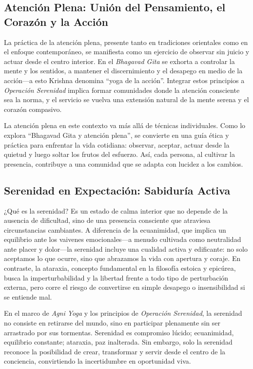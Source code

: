 \documentclass[
]{book}
\begin{document}
\subsection{Atención Plena: Unión del Pensamiento, el Corazón y la Acción}\label{atenciuxf3n-plena-uniuxf3n-del-pensamiento-el-corazuxf3n-y-la-acciuxf3n}

La práctica de la atención plena, presente tanto en tradiciones orientales como en el enfoque contemporáneo, se manifiesta como un ejercicio de observar sin juicio y actuar desde el centro interior. En el \emph{Bhagavad Gita} se exhorta a controlar la mente y los sentidos, a mantener el discernimiento y el desapego en medio de la acción---a esto Krishna denomina ``yoga de la acción''. Integrar estos principios a \emph{Operación Serenidad} implica formar comunidades donde la atención consciente sea la norma, y el servicio se vuelva una extensión natural de la mente serena y el corazón compasivo.

La atención plena en este contexto va más allá de técnicas individuales. Como lo explora ``Bhagavad Gita y atención plena'', se convierte en una guía ética y práctica para enfrentar la vida cotidiana: observar, aceptar, actuar desde la quietud y luego soltar los frutos del esfuerzo. Así, cada persona, al cultivar la presencia, contribuye a una comunidad que se adapta con lucidez a los cambios.

\subsection{Serenidad en Expectación: Sabiduría Activa}\label{serenidad-en-expectaciuxf3n-sabiduruxeda-activa}

¿Qué es la serenidad? Es un estado de calma interior que no depende de la ausencia de dificultad, sino de una presencia consciente que atraviesa circunstancias cambiantes. A diferencia de la ecuanimidad, que implica un equilibrio ante los vaivenes emocionales---a menudo cultivada como neutralidad ante placer y dolor---la serenidad incluye una cualidad activa y edificante: no solo aceptamos lo que ocurre, sino que abrazamos la vida con apertura y coraje. En contraste, la ataraxia, concepto fundamental en la filosofía estoica y epicúrea, busca la imperturbabilidad y la libertad frente a todo tipo de perturbación externa, pero corre el riesgo de convertirse en simple desapego o insensibilidad si se entiende mal.

En el marco de \emph{Agni Yoga} y los principios de \emph{Operación Serenidad}, la serenidad no consiste en retirarse del mundo, sino en participar plenamente sin ser arrastrado por sus tormentas. Serenidad es compromiso lúcido; ecuanimidad, equilibrio constante; ataraxia, paz inalterada. Sin embargo, solo la serenidad reconoce la posibilidad de crear, transformar y servir desde el centro de la conciencia, convirtiendo la incertidumbre en oportunidad viva.
\end{document}
